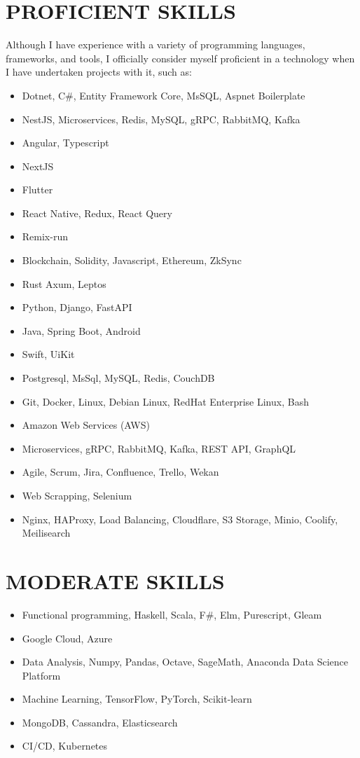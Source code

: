 \documentclass[line,margin]{res}
\begin{document}
\begin{resume}
\section{\textbf{PROFICIENT SKILLS}} Although I have experience with a variety of programming languages, frameworks, and tools, I officially consider myself proficient in a technology when I have undertaken projects with it, such as:
\begin{itemize}
\item Dotnet, C\#, Entity Framework Core, MsSQL, Aspnet Boilerplate
\item NestJS, Microservices, Redis, MySQL, gRPC, RabbitMQ, Kafka
\item Angular, Typescript
\item NextJS
\item Flutter
\item React Native, Redux, React Query
\item Remix-run
\item Blockchain, Solidity, Javascript, Ethereum, ZkSync
\item Rust Axum, Leptos
\item Python, Django, FastAPI
\item Java, Spring Boot, Android
\item Swift, UiKit
\item Postgresql, MsSql, MySQL, Redis, CouchDB 
\item Git, Docker, Linux, Debian Linux, RedHat Enterprise Linux, Bash
\item Amazon Web Services (AWS)
\item Microservices, gRPC, RabbitMQ, Kafka, REST API, GraphQL
\item Agile, Scrum, Jira, Confluence, Trello, Wekan
\item Web Scrapping, Selenium
\item Nginx, HAProxy, Load Balancing, Cloudflare, S3 Storage, Minio, Coolify, Meilisearch
\end{itemize}

\section{\textbf{MODERATE SKILLS}}
\begin{itemize}
        \item Functional programming, Haskell, Scala, F\#, Elm, Purescript, Gleam
        \item Google Cloud, Azure
        \item Data Analysis, Numpy, Pandas, Octave, SageMath, Anaconda Data Science Platform
        \item Machine Learning, TensorFlow, PyTorch, Scikit-learn
        \item MongoDB, Cassandra, Elasticsearch
        \item CI/CD, Kubernetes
\end{itemize}
 

\end{resume}
\end{document}
